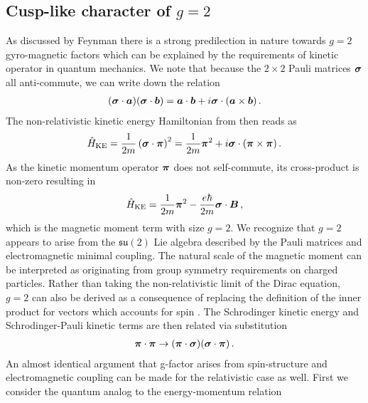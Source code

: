 \subsection{Cusp-like character of $g=2$}\label{ajss:spin}
As discussed by Feynman \cite{Feynman:1961} there is a strong predilection in nature towards $g=2$ gyro-magnetic factors which can be explained by the requirements of kinetic operator in quantum mechanics. We note that because the $2\times2$ Pauli matrices $\boldsymbol{\sigma}$ all anti-commute, we can write down the relation
\begin{alignat}{1}
	\label{eq:quantumdipole:08} (\boldsymbol{\sigma}\cdot\boldsymbol{a})(\boldsymbol{\sigma}\cdot\boldsymbol{b})=\boldsymbol{a}\cdot\boldsymbol{b}+i\boldsymbol{\sigma}\cdot(\boldsymbol{a}\times\boldsymbol{b})\,.
\end{alignat}
The non-relativistic kinetic energy Hamiltonian from  then reads as
\begin{alignat}{1}
	\label{eq:quantumdipole:09} \hat{H}_{\mathrm{KE}}=\frac{1}{2m}\left(\boldsymbol{\sigma}\cdot\boldsymbol{\pi}\right)^{2}=\frac{1}{2m}\boldsymbol{\pi}^{2}+i\boldsymbol{\sigma}\cdot(\boldsymbol{\pi}\times\boldsymbol{\pi})\,.
\end{alignat}
As the kinetic momentum operator $\boldsymbol{\pi}$ does not self-commute, its cross-product is non-zero resulting in
\begin{alignat}{1}
	\label{eq:quantumdipole:11} \hat{H}_{\mathrm{KE}}=\frac{1}{2m}\boldsymbol{\pi}^{2}-\frac{e\hbar}{2m}\boldsymbol{\sigma}\cdot\boldsymbol{B}\,,
\end{alignat}
which is the magnetic moment term with size $g=2$. We recognize that $g=2$ appears to arise from the $\mathfrak{su}(2)$ Lie algebra \cite{Schutz:1980} described by the Pauli matrices and electromagnetic minimal coupling. The natural scale of the magnetic moment can be interpreted as originating from group symmetry requirements on charged particles. Rather than taking the non-relativistic limit of the Dirac equation, $g=2$ can also be derived as a consequence of replacing the definition of the inner product for vectors which accounts for spin \cite{Feynman:1961}. The Schrodinger kinetic energy and Schrodinger-Pauli kinetic terms are then related via substitution
\begin{alignat}{1}
	\label{eq:spin:01} \boldsymbol{\pi}\cdot\boldsymbol{\pi} \rightarrow (\boldsymbol{\pi}\cdot\boldsymbol{\sigma})(\boldsymbol{\sigma}\cdot\boldsymbol{\pi})\,.
\end{alignat}
An almost identical argument that g-factor arises from spin-structure and electromagnetic coupling can be made for the relativistic case as well. First we consider the quantum analog to the energy-momentum relation
